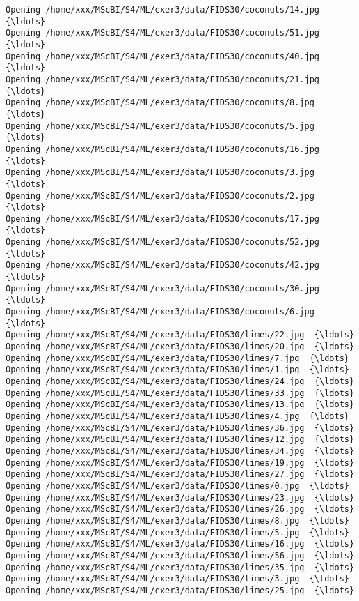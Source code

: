 \documentclass[11pt]{article}
\begin{document}
\begin{Verbatim}[commandchars=\\\{\}]
Opening /home/xxx/MScBI/S4/ML/exer3/data/FIDS30/coconuts/14.jpg  {\ldots}
Opening /home/xxx/MScBI/S4/ML/exer3/data/FIDS30/coconuts/51.jpg  {\ldots}
Opening /home/xxx/MScBI/S4/ML/exer3/data/FIDS30/coconuts/40.jpg  {\ldots}
Opening /home/xxx/MScBI/S4/ML/exer3/data/FIDS30/coconuts/21.jpg  {\ldots}
Opening /home/xxx/MScBI/S4/ML/exer3/data/FIDS30/coconuts/8.jpg  {\ldots}
Opening /home/xxx/MScBI/S4/ML/exer3/data/FIDS30/coconuts/5.jpg  {\ldots}
Opening /home/xxx/MScBI/S4/ML/exer3/data/FIDS30/coconuts/16.jpg  {\ldots}
Opening /home/xxx/MScBI/S4/ML/exer3/data/FIDS30/coconuts/3.jpg  {\ldots}
Opening /home/xxx/MScBI/S4/ML/exer3/data/FIDS30/coconuts/2.jpg  {\ldots}
Opening /home/xxx/MScBI/S4/ML/exer3/data/FIDS30/coconuts/17.jpg  {\ldots}
Opening /home/xxx/MScBI/S4/ML/exer3/data/FIDS30/coconuts/52.jpg  {\ldots}
Opening /home/xxx/MScBI/S4/ML/exer3/data/FIDS30/coconuts/42.jpg  {\ldots}
Opening /home/xxx/MScBI/S4/ML/exer3/data/FIDS30/coconuts/30.jpg  {\ldots}
Opening /home/xxx/MScBI/S4/ML/exer3/data/FIDS30/coconuts/6.jpg  {\ldots}
Opening /home/xxx/MScBI/S4/ML/exer3/data/FIDS30/limes/22.jpg  {\ldots}
Opening /home/xxx/MScBI/S4/ML/exer3/data/FIDS30/limes/20.jpg  {\ldots}
Opening /home/xxx/MScBI/S4/ML/exer3/data/FIDS30/limes/7.jpg  {\ldots}
Opening /home/xxx/MScBI/S4/ML/exer3/data/FIDS30/limes/1.jpg  {\ldots}
Opening /home/xxx/MScBI/S4/ML/exer3/data/FIDS30/limes/24.jpg  {\ldots}
Opening /home/xxx/MScBI/S4/ML/exer3/data/FIDS30/limes/33.jpg  {\ldots}
Opening /home/xxx/MScBI/S4/ML/exer3/data/FIDS30/limes/13.jpg  {\ldots}
Opening /home/xxx/MScBI/S4/ML/exer3/data/FIDS30/limes/4.jpg  {\ldots}
Opening /home/xxx/MScBI/S4/ML/exer3/data/FIDS30/limes/36.jpg  {\ldots}
Opening /home/xxx/MScBI/S4/ML/exer3/data/FIDS30/limes/12.jpg  {\ldots}
Opening /home/xxx/MScBI/S4/ML/exer3/data/FIDS30/limes/34.jpg  {\ldots}
Opening /home/xxx/MScBI/S4/ML/exer3/data/FIDS30/limes/19.jpg  {\ldots}
Opening /home/xxx/MScBI/S4/ML/exer3/data/FIDS30/limes/27.jpg  {\ldots}
Opening /home/xxx/MScBI/S4/ML/exer3/data/FIDS30/limes/0.jpg  {\ldots}
Opening /home/xxx/MScBI/S4/ML/exer3/data/FIDS30/limes/23.jpg  {\ldots}
Opening /home/xxx/MScBI/S4/ML/exer3/data/FIDS30/limes/26.jpg  {\ldots}
Opening /home/xxx/MScBI/S4/ML/exer3/data/FIDS30/limes/8.jpg  {\ldots}
Opening /home/xxx/MScBI/S4/ML/exer3/data/FIDS30/limes/5.jpg  {\ldots}
Opening /home/xxx/MScBI/S4/ML/exer3/data/FIDS30/limes/16.jpg  {\ldots}
Opening /home/xxx/MScBI/S4/ML/exer3/data/FIDS30/limes/56.jpg  {\ldots}
Opening /home/xxx/MScBI/S4/ML/exer3/data/FIDS30/limes/35.jpg  {\ldots}
Opening /home/xxx/MScBI/S4/ML/exer3/data/FIDS30/limes/3.jpg  {\ldots}
Opening /home/xxx/MScBI/S4/ML/exer3/data/FIDS30/limes/25.jpg  {\ldots}

\end{Verbatim}
\end{document}
